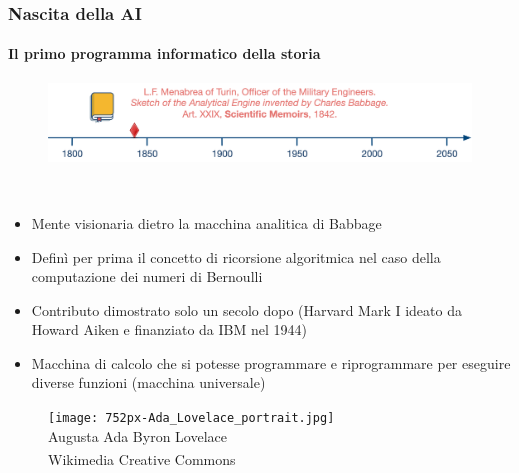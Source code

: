 \begin{frame}[t] \frametitle{Nascita della AI}
	{\scriptsize
		\onslide<1->
            \framesubtitle{Il primo programma informatico della storia}
            \vspace*{-.5cm}
             \begin{minipage}[t]{\textwidth}
             	\begin{figure}[ht]
                    \centering
                    \includegraphics[width=\textwidth]{img/AI-timeline-1842-alt.png}
                \end{figure}
            \end{minipage}
            \\\vspace*{.3cm}
	    	\begin{minipage}[t]{\textwidth}
				\begin{minipage}[t]{0.6\textwidth}
	    			\begin{itemize}[leftmargin=10pt,align=right]
						\onslide<2->\item[\alert{\faHandORight}] Mente visionaria dietro la \alert{macchina analitica di Babbage}
						\onslide<3->\item[\alert{\faHandORight}] Definì per prima il concetto di \alert{ricorsione algoritmica} nel caso della computazione dei numeri di Bernoulli
						\onslide<4->\item[\alert{\faHandORight}] Contributo dimostrato solo un secolo dopo (Harvard Mark I ideato da Howard Aiken e finanziato da IBM nel 1944)
						\onslide<5->\item[\alert{\faHandORight}] Macchina di calcolo che si potesse programmare e riprogrammare per eseguire diverse funzioni (\alert{macchina universale})
					\end{itemize}
            	\end{minipage}
            	\begin{minipage}[t]{0.4\textwidth}
                	\centering
                	\begin{figure}[ht]
                    	\texttt{[image: 752px-Ada\_Lovelace\_portrait.jpg]}
                    	{\tiny\\Augusta Ada Byron Lovelace\\\textsuperscript{\textcopyright}Wikimedia Creative Commons}
                	\end{figure}
            	\end{minipage}
	    	\end{minipage}
	}
\end{frame}
